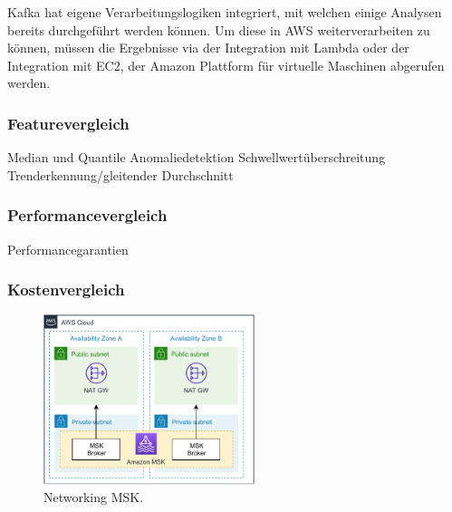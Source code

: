 Kafka hat eigene Verarbeitungslogiken integriert, mit welchen einige Analysen bereits durchgeführt werden können. Um diese in \ac{AWS} weiterverarbeiten zu können, müssen die Ergebnisse via der Integration mit Lambda oder der Integration mit \ac{EC2}, der Amazon Plattform für virtuelle Maschinen abgerufen werden.

\subsubsection{Featurevergleich}
Median und Quantile
Anomaliedetektion
Schwellwertüberschreitung
Trenderkennung/gleitender Durchschnitt

\subsubsection{Performancevergleich}
Performancegarantien

\subsubsection{Kostenvergleich}
\begin{figure}[H]
\centering
\includegraphics[width=0.55\textwidth]{graphics/MSK-Networking.pdf}
\caption[Networking MSK]{Networking MSK.\footnotemark}
\label{abb:NetworkingMSK}
\end{figure}


